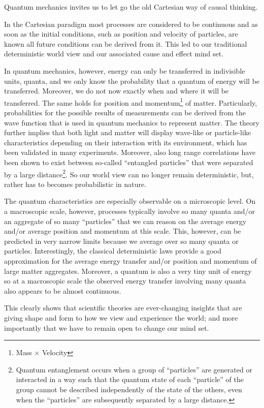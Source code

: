 \documentclass[
  11pt,
]{book}
\begin{document}
Quantum mechanics invites us to let go the old Cartesian way of causal thinking.

In the Cartesian paradigm most processes are considered to be continuous and as soon as the initial conditions, such as position and velocity of particles, are known all future conditions can be derived from it. This led to our traditional deterministic world view and our associated cause and effect mind set.

In quantum mechanics, however, energy can only be transferred in indivisible units, quanta, and we only know the probability that a quantum of energy will be transferred. Moreover, we do not now exactly when and where it will be transferred. The same holds for position and momentum\footnote{Mass \(\times\) Velocity} of matter. Particularly, probabilities for the possible results of measurements can be derived from the wave function that is used in quantum mechanics to represent matter. The theory further implies that both light and matter will display wave-like or particle-like characteristics depending on their interaction with its environment, which has been validated in many experiments. Moreover, also long range correlations have been shown to exist between so-called ``entangled particles'' that were separated by a large distance\footnote{Quantum entanglement occurs when a group of ``particles'' are generated or interacted in a way such that the quantum state of each ``particle'' of the group cannot be described independently of the state of the others, even when the ``particles'' are subsequently separated by a large distance.}. So our world view can no longer remain deterministic, but, rather has to becomes probabilistic in nature.

The quantum characteristics are especially observable on a microscopic level. On a macroscopic scale, however, processes typically involve so many quanta and/or an aggregate of so many ``particles'' that we can reason on the average energy and/or average position and momentum at this scale. This, however, can be predicted in very narrow limits because we average over so many quanta or particles. Interestingly, the classical deterministic laws provide a good approximation for the average energy transfer and/or position and momentum of large matter aggregates. Moreover, a quantum is also a very tiny unit of energy so at a macroscopic scale the observed energy transfer involving many quanta also appears to be almost continuous.

This clearly shows that scientific theories are ever-changing insights that are giving shape and form to how we view and experience the world; and more importantly that we have to remain open to change our mind set.

  
\end{document}
